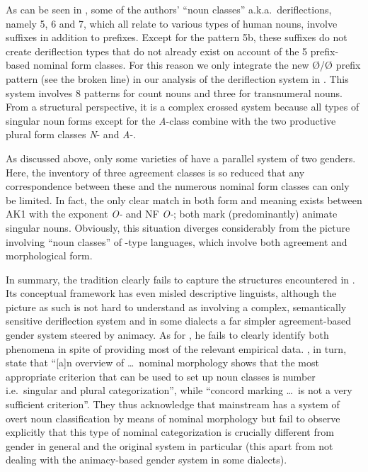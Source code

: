 \documentclass[output=collectionpaper]{langsci/langscibook}
\begin{document}
As can be seen in , some of the authors' ``noun classes'' a.k.a.\ deriflections, namely 5, 6 and 7, which all relate to various types of human nouns, involve suffixes in addition to prefixes. Except for the pattern 5b, these suffixes do not create deriflection types that do not already exist on account of the 5 prefix-based nominal form classes. For this reason we only integrate the new Ø/Ø prefix pattern  (see the broken line) in our analysis of the deriflection system in . This system involves 8 patterns for count nouns and three for transnumeral nouns. From a structural perspective, it is a complex crossed system because all types of singular noun forms except for the \textit{A}{}-class combine with the two productive plural form classes \textit{N}{}- and \textit{A}{}-.

As discussed above, only some varieties of  have a parallel system of two genders. Here, the inventory of three agreement classes is so reduced that any correspondence between these and the numerous nominal form classes can only be limited. In fact, the only clear match in both form and meaning exists between AK1 with the exponent \textit{O{}-} and NF \textit{O-}; both mark (predominantly) animate singular nouns. Obviously, this situation diverges considerably from the picture involving ``noun classes'' of -type languages, which involve both agreement and morphological form.

In summary, the  tradition clearly fails to capture the structures encountered in . Its conceptual framework has even misled descriptive linguists, although the picture as such is not hard to understand as involving a complex, semantically sensitive deriflection system and in some dialects a far simpler agreement-based gender system steered by animacy. As for \citet{Osam1993}, he fails to clearly identify both phenomena in spite of providing most of the relevant empirical data. \citet[206]{Bodomo2006}, in turn, state that ``[a]n overview of \ldots\ nominal morphology shows that the most appropriate criterion that can be used to set up noun classes is number \textendash{} i.e.\ singular and plural \textendash{} categorization'', while ``concord marking \ldots\ is not a very sufficient criterion''. They thus acknowledge that mainstream  has a system of overt noun classification by means of nominal morphology but fail to observe explicitly that this type of nominal categorization is crucially different from gender in general and the original  system in particular (this apart from not dealing with the animacy-based gender system in some dialects).
\end{document}
